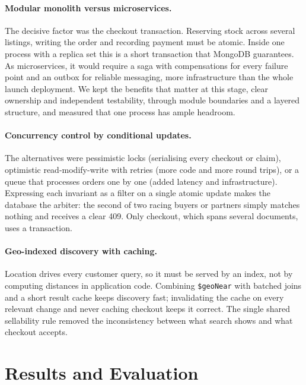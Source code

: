 \documentclass[manuscript,screen,review]{acmart}
\begin{document}
\paragraph{Modular monolith versus microservices.} The decisive factor was the checkout transaction. Reserving stock across several listings, writing the order and recording payment must be atomic. Inside one process with a replica set this is a short transaction that MongoDB guarantees. As microservices, it would require a saga with compensations for every failure point and an outbox for reliable messaging, more infrastructure than the whole launch deployment. We kept the benefits that matter at this stage, clear ownership and independent testability, through module boundaries and a layered structure, and measured that one process has ample headroom.

\paragraph{Concurrency control by conditional updates.} The alternatives were pessimistic locks (serialising every checkout or claim), optimistic read-modify-write with retries (more code and more round trips), or a queue that processes orders one by one (added latency and infrastructure). Expressing each invariant as a filter on a single atomic update makes the database the arbiter: the second of two racing buyers or partners simply matches nothing and receives a clear 409. Only checkout, which spans several documents, uses a transaction.

\paragraph{Geo-indexed discovery with caching.} Location drives every customer query, so it must be served by an index, not by computing distances in application code. Combining \texttt{\$geoNear} with batched joins and a short result cache keeps discovery fast; invalidating the cache on every relevant change and never caching checkout keeps it correct. The single shared sellability rule removed the inconsistency between what search shows and what checkout accepts.

\section{Results and Evaluation}
\label{sec:results}
\end{document}
